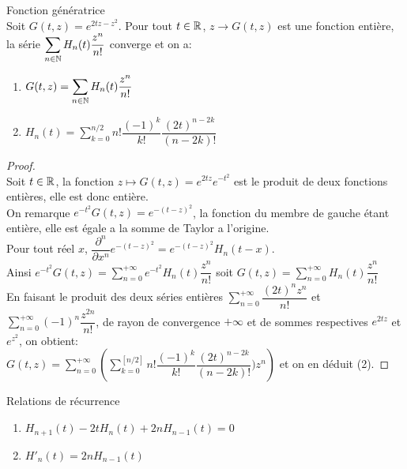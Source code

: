 \bprop
Fonction génératrice
\\Soit $ G(t,z)=e^{2tz-z^{2}}$. Pour tout $ t\in \mathbb R $, $ z\rightarrow G(t,z) $ est une fonction entière, la série $ \displaystyle{\sum\limits_{n \in \mathbb N}H_{n}(t)\dfrac{z^{n}}{n!}} $ converge et on a:
\begin{enumerate}
\item $ \displaystyle{G(t,z)=\sum\limits_{n \in \mathbb N}H_{n}(t)\dfrac{z^{n}}{n!}}$
\item $ \displaystyle{H_{n}(t) = \sum\limits_{k=0}^{n/2}n!\dfrac{(-1)^{k}}{k!}\dfrac{(2t)^{n-2k}}{(n-2k)!}}$
\end{enumerate}
\eprop

\begin{proof}
$ $\\
Soit $ t \in \mathbb R $, la fonction $  z \longmapsto G(t,z)= e^{2tz}e^{-t^{2}} $ est le produit de deux fonctions entières, elle est donc entière.
\\On remarque $ e^{-t^{2}}G(t,z)=e^{-(t-z)^{2}} $, la fonction du membre de gauche étant entière, elle est égale a la somme de Taylor a l'origine.
\\Pour tout réel $ x $, $\dfrac{\partial^{n}}{\partial x^{n}}e^{-(t-z)^{2}}=e^{-(t-z)^{2}}H_{n}(t-x)$.
\\Ainsi $ \displaystyle{e^{-t^{2}}G(t,z)=\sum\limits_{n=0}^{+\infty}e^{-t^{2}}H_{n}(t)\dfrac{z^{n}}{n!}}$ soit $\displaystyle{G(t,z)=\sum\limits_{n=0}^{+\infty}H_{n}(t)\dfrac{z^{n}}{n!}}$
\\En faisant le produit des deux séries entières $\displaystyle{\sum\limits_{n=0}^{+\infty}\dfrac{(2t)^{n}z^{n}}{n!}}$ et $\displaystyle{\sum\limits_{n=0}^{+\infty}(-1)^{n}\dfrac{z^{2n}}{n!}}$, de rayon de convergence $ +\infty $ et de sommes respectives $ e^{2tz} $ et $ e^{z^{2}} $, on obtient:
\\$ \displaystyle{G(t,z)=\sum\limits_{n=0}^{+\infty}\left(\sum\limits_{k=0}^{[n/2]}n!\dfrac{(-1)^{k}}{k!}\dfrac{(2t)^{n-2k}}{(n-2k)!})z^{n}\right)}$ et on en déduit (2).
\end{proof}

\bprop
Relations de récurrence
\begin{enumerate}
\item $ H_{n+1}(t)-2tH_{n}(t)+2nH_{n-1}(t)=0$
\item $ {H'}_{n}(t) = 2nH_{n-1}(t)$
\end{enumerate}
\eprop

